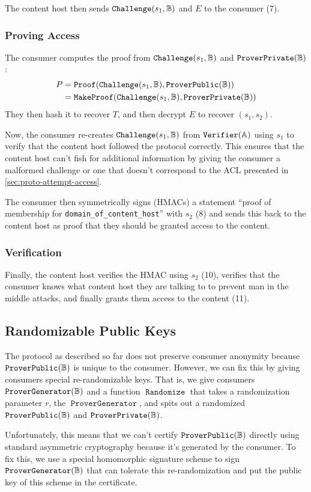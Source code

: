 \documentclass[pdftex,12pt,a4papaer,twoside,notitlepage]{report}
\DeclareMathOperator{\PvecG}{\mathtt{ProverGenerator}}
\DeclareMathOperator{\Proof}{\mathtt{Proof}}
\DeclareMathOperator{\mProof}{\mathtt{MakeProof}}
\DeclareMathOperator{\rand}{\mathtt{Randomize}}
\begin{document}
The content host then sends $\operatorname{\mathtt{Challenge}}(s_1, \mathbb{B})$ and $E$ to the consumer (7).

\subsubsection{Proving Access}

The consumer computes the proof from $\operatorname{\mathtt{Challenge}}(s_1, \mathbb{B})$ and $\operatorname{\mathtt{ProverPrivate}}(\mathbb{B})$:
\begin{align*}
  P &= \Proof(\Cv, \Pv) \\
    &= \mProof(\Cv, \Sv)
\end{align*}
They then hash it to recover $T$, and then decrypt $E$ to recover $(s_1, s_2)$.

Now, the consumer re-creates $\operatorname{\mathtt{Challenge}}(s_1, \mathbb{B})$ from $\operatorname{\mathtt{Verifier}}(\mathbb{A})$ using $s_1$ to verify that the
content host followed the protocol correctly. This ensures that the content host
can't fish for additional information by giving the consumer a malformed
challenge or one that doesn't correspond to the ACL presented in
\cref{sec:proto-attempt-access}.

The consumer then symmetrically signs (HMACs) a statement ``proof of membership
for \texttt{domain\_of\_content\_host}'' with $s_2$ (8) and sends this back to
the content host as proof that they should be granted access to the content.

\subsubsection{Verification}

Finally, the content host verifies the HMAC using $s_2$ (10), verifies that the
consumer knows what content host they are talking to to prevent man in the
middle attacks, and finally grants them access to the content (11).

\subsection{Randomizable Public Keys}
\label{sec:proto-random-key}

\sloppy The protocol as described so far does not preserve consumer anonymity
because $\operatorname{\mathtt{ProverPublic}}(\mathbb{B})$ is unique to the consumer. However, we can fix this by giving
consumers special re-randomizable keys. That is, we give consumers $\Pvg$ and a
function $\rand$ that takes a randomization parameter $r$, the $\PvecG$, and
spits out a randomized $\operatorname{\mathtt{ProverPublic}}(\mathbb{B})$ and $\operatorname{\mathtt{ProverPrivate}}(\mathbb{B})$.

Unfortunately, this means that we can't certify $\operatorname{\mathtt{ProverPublic}}(\mathbb{B})$ directly using standard
asymmetric cryptography because it's generated by the consumer. To fix this, we
use a special homomorphic signature scheme to sign $\Pvg$ that can tolerate this
re-randomization and put the public key of this scheme in the certificate.
\end{document}
